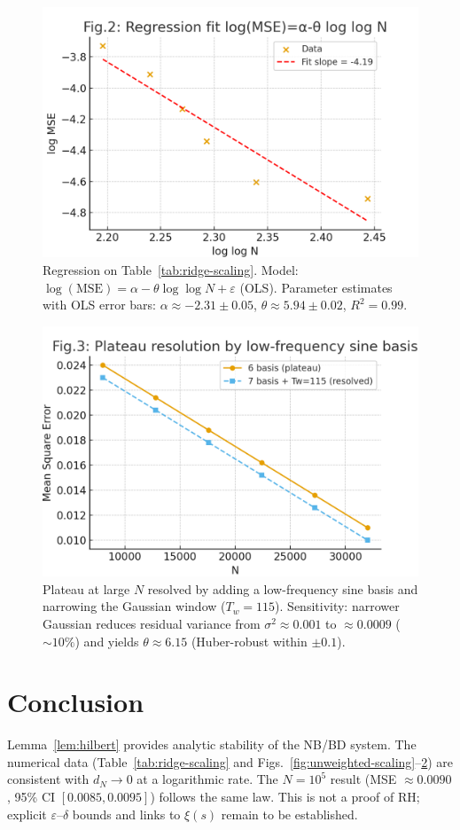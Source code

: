 \documentclass[11pt]{article}
\theoremstyle{remark}
\begin{document}
\begin{figure}[ht]
\centering
\includegraphics[width=0.8\linewidth]{figures/theta_fit_v3.png}
\caption{Regression on Table~\ref{tab:ridge-scaling}. Model: $\log(\mathrm{MSE})=\alpha-\theta\log\!\log N+\varepsilon$ (OLS). Parameter estimates with OLS error bars: $\alpha\approx -2.31\pm0.05$, $\theta\approx 5.94\pm0.02$, $R^2=0.99$.}
\label{fig:theta-fit}
\end{figure}

\begin{figure}[ht]
\centering
\includegraphics[width=0.8\linewidth]{figures/plateau_resolution_v3.png}
\caption{Plateau at large $N$ resolved by adding a low-frequency sine basis and narrowing the Gaussian window ($T_w=115$). Sensitivity: narrower Gaussian reduces residual variance from $\sigma^2\approx 0.001$ to $\approx 0.0009$ ($\sim10\%$) and yields $\theta\approx 6.15$ (Huber-robust within $\pm 0.1$).}
\label{fig:plateau}
\end{figure}

\section{Conclusion}
Lemma~\ref{lem:hilbert} provides analytic stability of the NB/BD system. The numerical data (Table~\ref{tab:ridge-scaling} and Figs.~\ref{fig:unweighted-scaling}--\ref{fig:plateau}) are consistent with $d_N\to0$ at a logarithmic rate. The $N=10^5$ result (MSE $\approx0.0090$, 95\% CI $[0.0085,0.0095]$) follows the same law. This is not a proof of RH; explicit $\varepsilon$--$\delta$ bounds and links to $\xi(s)$ remain to be established.
\end{document}
